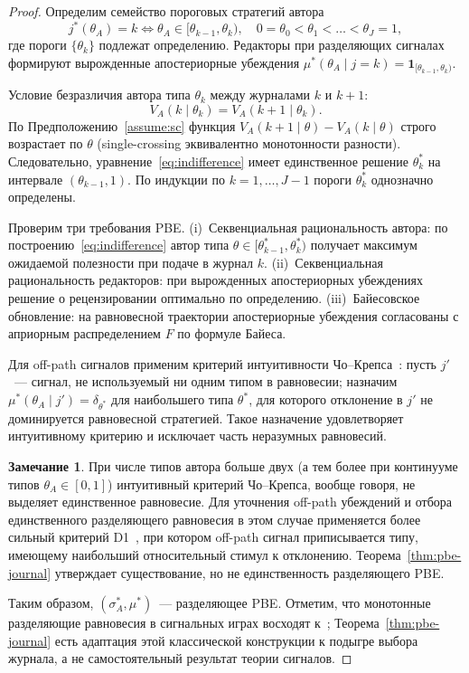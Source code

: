 \documentclass[12pt,a4paper]{article}
\theoremstyle{definition}
\newtheorem{remark}{Замечание}
\begin{document}
\begin{proof}
  Определим семейство пороговых стратегий автора
  \[
    j^*(\theta_A) = k \iff \theta_A \in [\theta_{k-1}, \theta_k),
    \quad 0 = \theta_0 < \theta_1 < \dots < \theta_J = 1,
  \]
  где пороги $\{\theta_k\}$ подлежат определению. Редакторы при
  разделяющих сигналах формируют вырожденные апостериорные убеждения
  $\mu^{*}(\theta_A \mid j = k) = \mathbf{1}_{[\theta_{k-1}, \theta_k)}$.

  Условие безразличия автора типа $\theta_k$ между журналами $k$ и $k+1$:
  \begin{equation}
    V_A(k \mid \theta_k) = V_A(k+1 \mid \theta_k).
    \label{eq:indifference}
  \end{equation}
  По Предположению~\ref{assume:sc} функция $V_A(k+1 \mid \theta) -
  V_A(k \mid \theta)$ строго возрастает по $\theta$ (single-crossing
  эквивалентно монотонности разности). Следовательно,
  уравнение~\eqref{eq:indifference} имеет единственное решение
  $\theta_k^{*}$ на интервале $(\theta_{k-1}, 1)$. По индукции по $k
  = 1, \dots, J-1$ пороги $\theta_k^{*}$ однозначно определены.

  Проверим три требования PBE. (i)~Секвенциальная рациональность
  автора: по построению~\eqref{eq:indifference} автор типа $\theta
  \in [\theta_{k-1}^{*}, \theta_k^{*})$ получает максимум ожидаемой
  полезности при подаче в журнал $k$. (ii)~Секвенциальная
  рациональность редакторов: при вырожденных апостериорных убеждениях
  решение о рецензировании оптимально по определению.
  (iii)~Байесовское обновление: на равновесной траектории
  апостериорные убеждения согласованы с априорным распределением $F$
  по формуле Байеса.

  Для off-path сигналов применим критерий интуитивности
  Чо--Крепса~\citep{cho1987}: пусть $j'$~--- сигнал, не используемый
  ни одним типом в равновесии; назначим $\mu^{*}(\theta_A \mid j') =
  \delta_{\theta^*}$ для наибольшего типа $\theta^*$, для которого
  отклонение в $j'$ не доминируется равновесной стратегией. Такое
  назначение удовлетворяет интуитивному критерию и исключает часть
  неразумных равновесий.

  \begin{remark}
    При числе типов автора больше двух (а тем более при континууме
    типов $\theta_A \in [0,1]$) интуитивный критерий Чо--Крепса,
    вообще говоря, не выделяет единственное равновесие. Для уточнения
    off-path убеждений и отбора единственного разделяющего равновесия
    в этом случае применяется более сильный критерий
    D1~\citep{banks1987}, при котором off-path сигнал приписывается
    типу, имеющему наибольший относительный стимул к отклонению.
    Теорема~\ref{thm:pbe-journal} утверждает существование, но не
    единственность разделяющего PBE.
  \end{remark}

  Таким образом, $(\sigma_A^{*}, \mu^{*})$~--- разделяющее PBE.
  Отметим, что монотонные разделяющие равновесия в сигнальных играх
  восходят к~\citep{spence1973}; Теорема~\ref{thm:pbe-journal} есть
  адаптация этой классической конструкции к подыгре выбора журнала, а
  не самостоятельный результат теории сигналов.
\end{proof}
\end{document}
